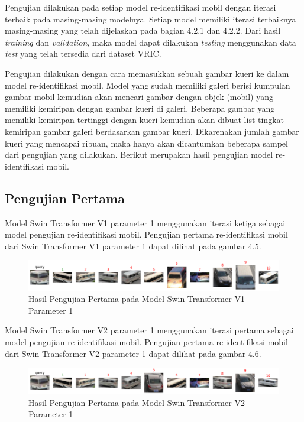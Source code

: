 Pengujian dilakukan pada setiap model re-identifikasi mobil dengan iterasi terbaik pada masing-masing modelnya. Setiap 
model memiliki iterasi terbaiknya masing-masing yang telah dijelaskan pada bagian 4.2.1 dan 4.2.2. Dari hasil \emph{training} 
dan \emph{validation}, maka model dapat dilakukan \emph{testing} menggunakan data \emph{test} yang telah tersedia dari 
dataset VRIC.

Pengujian dilakukan dengan cara memasukkan sebuah gambar kueri ke dalam model re-identifikasi mobil. Model yang sudah memiliki 
galeri berisi kumpulan gambar mobil kemudian akan mencari gambar dengan objek (mobil) yang memiliki kemiripan dengan gambar 
kueri di galeri. Beberapa gambar yang memiliki kemiripan tertinggi dengan kueri kemudian akan dibuat list tingkat kemiripan 
gambar galeri berdasarkan gambar kueri. Dikarenakan jumlah gambar kueri yang mencapai ribuan, maka hanya akan dicantumkan 
beberapa sampel dari pengujian yang dilakukan. Berikut merupakan hasil pengujian model re-identifikasi mobil.

\subsection{Pengujian Pertama}

Model Swin Transformer V1 parameter 1 menggunakan iterasi ketiga sebagai model pengujian re-identifikasi mobil. Pengujian pertama
re-identifikasi mobil dari Swin Transformer V1 parameter 1 dapat dilihat pada gambar 4.5.

\begin{figure}[ht]
  \centering
  \includegraphics[scale=0.6]{gambar/Que8V1P1IT3.png}
  \caption{Hasil Pengujian Pertama pada Model Swin Transformer V1 Parameter 1}
  \label{fig:hasilpengujianpertamapadamodelswintransformerv1param1}
\end{figure}

Model Swin Transformer V2 parameter 1 menggunakan iterasi pertama sebagai model pengujian re-identifikasi mobil. Pengujian pertama
re-identifikasi mobil dari Swin Transformer V2 parameter 1 dapat dilihat pada gambar 4.6.

\begin{figure}[ht]
  \centering
  \includegraphics[scale=0.6]{gambar/Que8V2P1IT1.png}
  \caption{Hasil Pengujian Pertama pada Model Swin Transformer V2 Parameter 1}
  \label{fig:hasilpengujianpertamapadamodelswintransformerv2param1}
\end{figure}

